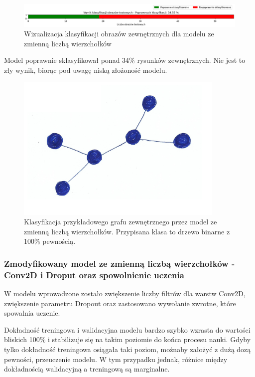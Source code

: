 \begin{figure}[ht]
	\centering
	\includegraphics[width=14cm]{resources/tests/images/v3/multiple_edges_bar.png}
	\caption{Wizualizacja klasyfikacji obrazów zewnętrznych dla modelu ze zmienną liczbą wierzchołków}
	\label{Fig:tests-var-0c}
\end{figure}
\FloatBarrier

Model poprawnie sklasyfikował ponad 34\% rysunków zewnętrznych.
Nie jest to zły wynik, biorąc pod uwagę niską złożoność modelu.

\begin{figure}[ht]
	\centering
	\includegraphics[width=10cm]{../graph_classification/test_graphs/drawn/tree-binary-1.png}
	\caption{Klasyfikacja przykładowego grafu zewnętrznego przez model ze zmienną liczbą wierzchołków.
		Przypisana klasa to drzewo binarne z 100\% pewnością.}
	\label{Fig:tests-var-0d}
\end{figure}
\FloatBarrier

\subsubsection{Zmodyfikowany model ze zmienną liczbą wierzchołków - Conv2D i Droput oraz spowolnienie uczenia}

W modelu wprowadzone zostało zwiększenie liczby filtrów dla warstw Conv2D, zwiększenie parametru Dropout
oraz zastosowano wywołanie zwrotne, które spowalnia uczenie.

Dokładność treningowa i walidacyjna modelu bardzo szybko wzrasta do wartości bliskich 100\%
i stabilizuje się na takim poziomie do końca procesu nauki.
Gdyby tylko dokładność treningowa osiągała taki poziom, możnaby założyć z dużą dozą pewności, przeuczenie modelu.
W tym przypadku jednak, różnice między dokładnością walidacyjną a treningową są marginalne.

